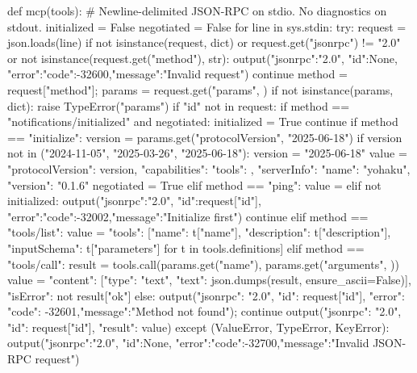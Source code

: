 def mcp(tools):
    # Newline-delimited JSON-RPC on stdio. No diagnostics on stdout.
    initialized = False
    negotiated = False
    for line in sys.stdin:
        try:
            request = json.loads(line)
            if not isinstance(request, dict) or request.get("jsonrpc") != "2.0" or not isinstance(request.get("method"), str):
                output({"jsonrpc":"2.0", "id":None, "error":{"code":-32600,"message":"Invalid request"}})
                continue
            method = request["method"]; params = request.get("params", {})
            if not isinstance(params, dict):
                raise TypeError("params")
            if "id" not in request:
                if method == "notifications/initialized" and negotiated: initialized = True
                continue
            if method == "initialize":
                version = params.get("protocolVersion", "2025-06-18")
                if version not in ("2024-11-05", "2025-03-26", "2025-06-18"): version = "2025-06-18"
                value = {"protocolVersion": version, "capabilities": {"tools": {}},
                    "serverInfo": {"name": "yohaku", "version": "0.1.6"}}
                negotiated = True
            elif method == "ping": value = {}
            elif not initialized:
                output({"jsonrpc":"2.0", "id":request["id"], "error":{"code":-32002,"message":"Initialize first"}})
                continue
            elif method == "tools/list": value = {"tools": [{"name": t["name"], "description": t["description"], "inputSchema": t["parameters"]} for t in tools.definitions]}
            elif method == "tools/call":
                result = tools.call(params.get("name"), params.get("arguments", {}))
                value = {"content": [{"type": "text", "text": json.dumps(result, ensure_ascii=False)}], "isError": not result["ok"]}
            else:
                output({"jsonrpc": "2.0", "id": request["id"], "error": {"code": -32601,"message":"Method not found"}}); continue
            output({"jsonrpc": "2.0", "id": request["id"], "result": value})
        except (ValueError, TypeError, KeyError):
            output({"jsonrpc":"2.0", "id":None, "error":{"code":-32700,"message":"Invalid JSON-RPC request"}})

